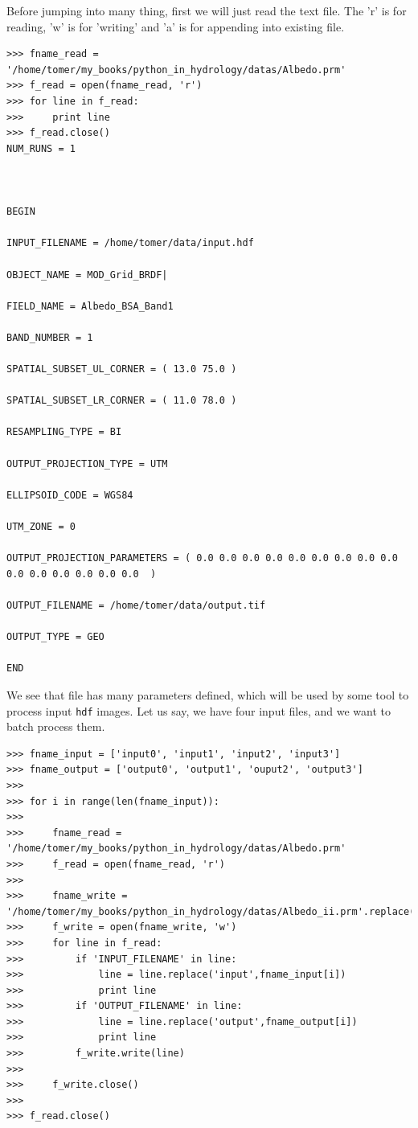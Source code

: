 \documentclass[10pt]{book}
\begin{document}
Before jumping into many thing, first we will just read the text file. The 'r' is for reading, 'w' is for 'writing' and 'a' is for appending into existing file. 
\beforeverb \begin{verbatim}
>>> fname_read = '/home/tomer/my_books/python_in_hydrology/datas/Albedo.prm'
>>> f_read = open(fname_read, 'r')
>>> for line in f_read:
>>>     print line
>>> f_read.close()
NUM_RUNS = 1



BEGIN

INPUT_FILENAME = /home/tomer/data/input.hdf

OBJECT_NAME = MOD_Grid_BRDF|

FIELD_NAME = Albedo_BSA_Band1

BAND_NUMBER = 1

SPATIAL_SUBSET_UL_CORNER = ( 13.0 75.0 )

SPATIAL_SUBSET_LR_CORNER = ( 11.0 78.0 )

RESAMPLING_TYPE = BI

OUTPUT_PROJECTION_TYPE = UTM

ELLIPSOID_CODE = WGS84

UTM_ZONE = 0

OUTPUT_PROJECTION_PARAMETERS = ( 0.0 0.0 0.0 0.0 0.0 0.0 0.0 0.0 0.0 0.0 0.0 0.0 0.0 0.0 0.0  )

OUTPUT_FILENAME = /home/tomer/data/output.tif

OUTPUT_TYPE = GEO

END
\end{verbatim} \afterverb
We see that file has many parameters defined, which will be used by some tool to process input \verb"hdf" images. Let us say, we have four input files, and we want to batch process them.

\beforeverb \begin{verbatim}
>>> fname_input = ['input0', 'input1', 'input2', 'input3']
>>> fname_output = ['output0', 'output1', 'ouput2', 'output3']
>>> 
>>> for i in range(len(fname_input)):
>>>     
>>>     fname_read = '/home/tomer/my_books/python_in_hydrology/datas/Albedo.prm'
>>>     f_read = open(fname_read, 'r')
>>> 
>>>     fname_write = '/home/tomer/my_books/python_in_hydrology/datas/Albedo_ii.prm'.replace('ii',str(i))
>>>     f_write = open(fname_write, 'w')
>>>     for line in f_read:
>>>         if 'INPUT_FILENAME' in line:
>>>             line = line.replace('input',fname_input[i])
>>>             print line
>>>         if 'OUTPUT_FILENAME' in line:
>>>             line = line.replace('output',fname_output[i])
>>>             print line
>>>         f_write.write(line)
>>>         
>>>     f_write.close()
>>> 
>>> f_read.close()
\end{verbatim} \afterverb
\end{document}
